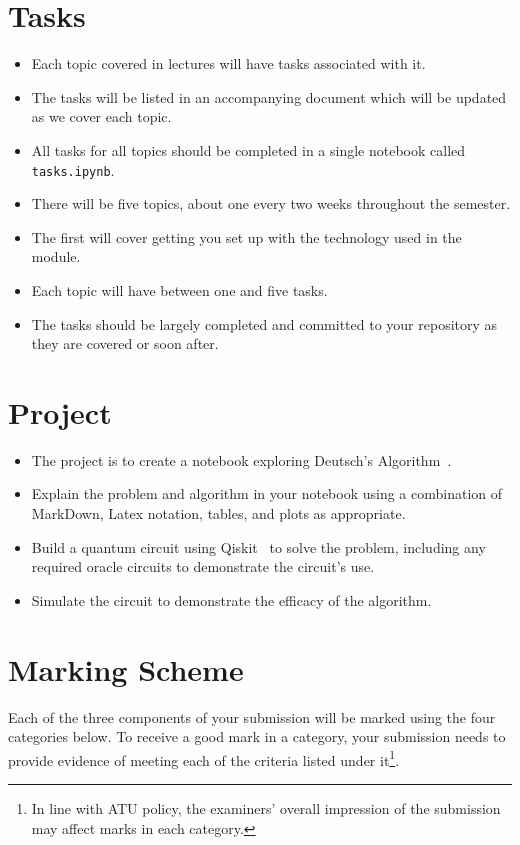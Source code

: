 \documentclass{iansnotes}
\begin{document}
\section{Tasks}

\begin{itemize}
  \item Each topic covered in lectures will have tasks associated with it.
  \item The tasks will be listed in an accompanying document which will be updated as we cover each topic.
  \item All tasks for all topics should be completed in a single notebook called \texttt{tasks.ipynb}.
  \item There will be five topics, about one every two weeks throughout the semester.
  \item The first will cover getting you set up with the technology used in the module.
  \item Each topic will have between one and five tasks.
  \item The tasks should be largely completed and committed to your repository as they are covered or soon after.
\end{itemize} 


\section{Project}

\begin{itemize}
  \item The project is to create a notebook exploring Deutsch's Algorithm~\autocite{qiskitdeutsch}.
  \item Explain the problem and algorithm in your notebook using a combination of MarkDown, Latex notation, tables, and plots as appropriate.
  \item Build a quantum circuit using Qiskit~\autocite{qiskit} to solve the problem, including any required oracle circuits to demonstrate the circuit's use.
  \item Simulate the circuit to demonstrate the efficacy of the algorithm.
\end{itemize} 


\section{Marking Scheme}
Each of the three components of your submission will be marked using the four categories below.
To receive a good mark in a category, your submission needs to provide evidence of meeting each of the criteria listed under it\footnote{In line with ATU policy, the examiners' overall impression of the submission may affect marks in each category.}.
\end{document}
